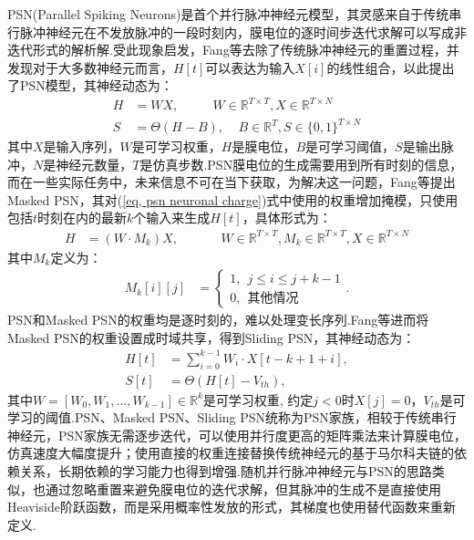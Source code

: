 \documentclass{SCIS2020cn}
\begin{document}
PSN(Parallel Spiking Neurons)\cite{fang2023parallel}是首个并行脉冲神经元模型，其灵感来自于传统串行脉冲神经元在不发放脉冲的一段时刻内，膜电位的逐时间步迭代求解可以写成非迭代形式的解析解.受此现象启发，Fang等\cite{fang2023parallel}去除了传统脉冲神经元的重置过程，并发现对于大多数神经元而言，$H[t]$可以表达为输入$X[i]$的线性组合，以此提出了PSN模型，其神经动态为：
\begin{align}
	H &= WX, ~~~~~~~~~~~~W \in \mathbb{R}^{T \times T}, X \in \mathbb{R}^{T \times N} \label{eq, psn neuronal charge}\\
	S &= \Theta(H -B), ~~~~~B \in \mathbb{R}^{T}, S\in \{0, 1\}^{T \times N}
\end{align}
其中$X$是输入序列，$W$是可学习权重，$H$是膜电位，$B$是可学习阈值，$S$是输出脉冲，$N$是神经元数量，$T$是仿真步数.PSN膜电位的生成需要用到所有时刻的信息，而在一些实际任务中，未来信息不可在当下获取，为解决这一问题，Fang等\cite{fang2023parallel}提出Masked PSN，其对(\ref{eq, psn neuronal charge})式中使用的权重增加掩模，只使用包括$t$时刻在内的最新$k$个输入来生成$H[t]$，具体形式为：
\begin{eqnarray}
	H &= (W \cdot M_{k})X, ~~~~~~~~~~~~~~~W \in \mathbb{R}^{T \times T}, M_{k} \in \mathbb{R}^{T \times T}, X \in \mathbb{R}^{T \times N}
\end{eqnarray}
其中$M_{k}$定义为：
\begin{eqnarray}
	M_{k}[i][j] &= \begin{cases}
		1, ~~ j \leq i \leq j + k - 1 \\
		0, ~~\text{其他情况}
	\end{cases}.
\end{eqnarray}
PSN和Masked PSN的权重均是逐时刻的，难以处理变长序列.Fang等\cite{fang2023parallel}进而将Masked PSN的权重设置成时域共享，得到Sliding PSN，其神经动态为：
\begin{align}
	H[t] &= \sum_{i=0}^{k-1}W_{i}\cdot X[t - k + 1 + i], \\
	S[t] &= \Theta(H[t] - V_{th}),
\end{align}
其中$W = [W_{0}, W_{1}, ..., W_{k-1}] \in \mathbb{R}^{k}$是可学习权重, 约定$j < 0$时$X[j]=0$，$V_{th}$是可学习的阈值.PSN、Masked PSN、Sliding PSN统称为PSN家族，相较于传统串行神经元，PSN家族无需逐步迭代，可以使用并行度更高的矩阵乘法来计算膜电位，仿真速度大幅度提升；使用直接的权重连接替换传统神经元的基于马尔科夫链的依赖关系，长期依赖的学习能力也得到增强.随机并行脉冲神经元\cite{10191884}与PSN的思路类似，也通过忽略重置来避免膜电位的迭代求解，但其脉冲的生成不是直接使用Heaviside阶跃函数，而是采用概率性发放的形式，其梯度也使用替代函数来重新定义.
\end{document}

